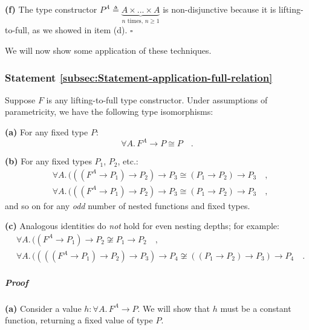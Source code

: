 \textbf{(f)} The type constructor $P^{A}\triangleq\underbrace{A\times...\times A}_{n\text{ times, }n\geq1}$
is non-disjunctive because it is lifting-to-full, as we showed in
item (d). $\square$

We will now show some application of these techniques.

\subsubsection{Statement \label{subsec:Statement-application-full-relation}\ref{subsec:Statement-application-full-relation}}

Suppose $F$ is any lifting-to-full type constructor. Under assumptions
of parametricity, we have the following type isomorphisms:

\textbf{(a)} For any fixed type $P$:
\[
\forall A.\,F^{A}\rightarrow P\cong P\quad.
\]

\textbf{(b)} For any fixed types $P_{1}$, $P_{2}$, etc.:
\begin{align*}
 & \forall A.\,(((F^{A}\rightarrow P_{1})\rightarrow P_{2})\rightarrow P_{3}\cong(P_{1}\rightarrow P_{2})\rightarrow P_{3}\quad,\\
 & \forall A.\,(((F^{A}\rightarrow P_{1})\rightarrow P_{2})\rightarrow P_{3}\cong(P_{1}\rightarrow P_{2})\rightarrow P_{3}\quad,
\end{align*}
and so on for any \emph{odd} number of nested functions and fixed
types.

\textbf{(c)} Analogous identities do \emph{not} hold for even nesting
depths; for example:
\begin{align*}
 & \forall A.\,((F^{A}\rightarrow P_{1})\rightarrow P_{2}\not\cong P_{1}\rightarrow P_{2}\quad,\\
 & \forall A.\,((((F^{A}\rightarrow P_{1})\rightarrow P_{2})\rightarrow P_{3})\rightarrow P_{4}\not\cong((P_{1}\rightarrow P_{2})\rightarrow P_{3})\rightarrow P_{4}\quad.
\end{align*}


\subparagraph{Proof}

\textbf{(a)} Consider a value $h:\forall A.\,F^{A}\rightarrow P$.
We will show that $h$ must be a constant function, returning a fixed
value of type $P$.

